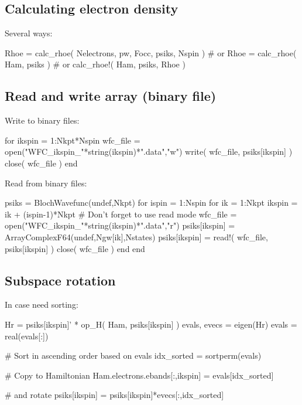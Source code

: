 \subsection*{Calculating electron density}

Several ways:
\begin{juliacode}
Rhoe = calc_rhoe( Nelectrons, pw, Focc, psiks, Nspin )
# or
Rhoe = calc_rhoe( Ham, psiks )
# or
calc_rhoe!( Ham, psiks, Rhoe )
\end{juliacode}

\subsection*{Read and write array (binary file)}

Write to binary files:
\begin{juliacode}
for ikspin = 1:Nkpt*Nspin
    wfc_file = open("WFC_ikspin_"*string(ikspin)*".data","w")
    write( wfc_file, psiks[ikspin] )
    close( wfc_file )
end
\end{juliacode}

Read from binary files:
\begin{juliacode}
psiks = BlochWavefunc(undef,Nkpt)
for ispin = 1:Nspin
for ik = 1:Nkpt
    ikspin = ik + (ispin-1)*Nkpt
    # Don't forget to use read mode
    wfc_file = open("WFC_ikspin_"*string(ikspin)*".data","r")
    psiks[ikspin] = Array{ComplexF64}(undef,Ngw[ik],Nstates)
    psiks[ikspin] = read!( wfc_file, psiks[ikspin] )
    close( wfc_file )
end
end
\end{juliacode}




\subsection*{Subspace rotation}

In case need sorting:

\begin{juliacode}
Hr = psiks[ikspin]' * op_H( Ham, psiks[ikspin] )
evals, evecs = eigen(Hr)
evals = real(evals[:])

# Sort in ascending order based on evals 
idx_sorted = sortperm(evals)

# Copy to Hamiltonian
Ham.electrons.ebands[:,ikspin] = evals[idx_sorted]

# and rotate
psiks[ikspin] = psiks[ikspin]*evecs[:,idx_sorted]
\end{juliacode}


